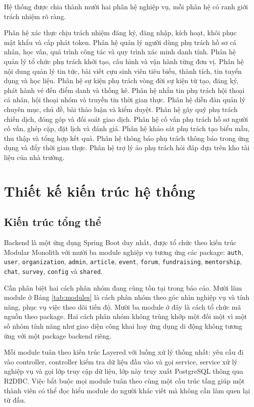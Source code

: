 \documentclass[12pt,a4paper,oneside]{report}
\begin{document}
Hệ thống được chia thành mười hai phân hệ nghiệp vụ, mỗi phân hệ có ranh giới trách nhiệm rõ ràng.

Phân hệ xác thực chịu trách nhiệm đăng ký, đăng nhập, kích hoạt, khôi phục mật khẩu và cấp phát token. Phân hệ quản lý người dùng phụ trách hồ sơ cá nhân, học vấn, quá trình công tác và quy trình xác minh danh tính. Phân hệ quản lý tổ chức phụ trách khởi tạo, cấu hình và vận hành từng đơn vị. Phân hệ nội dung quản lý tin tức, bài viết cựu sinh viên tiêu biểu, thành tích, tin tuyển dụng và học liệu. Phân hệ sự kiện phụ trách vòng đời sự kiện từ tạo, đăng ký, phát hành vé đến điểm danh và thống kê. Phân hệ nhắn tin phụ trách hội thoại cá nhân, hội thoại nhóm và truyền tin thời gian thực. Phân hệ diễn đàn quản lý chuyên mục, chủ đề, bài thảo luận và kiểm duyệt. Phân hệ gây quỹ phụ trách chiến dịch, đóng góp và đối soát giao dịch. Phân hệ cố vấn phụ trách hồ sơ người cố vấn, ghép cặp, đặt lịch và đánh giá. Phân hệ khảo sát phụ trách tạo biểu mẫu, thu thập và tổng hợp kết quả. Phân hệ thông báo phụ trách thông báo trong ứng dụng và đẩy thời gian thực. Phân hệ trợ lý ảo phụ trách hỏi đáp dựa trên kho tài liệu của nhà trường.

\section{Thiết kế kiến trúc hệ thống}

\subsection{Kiến trúc tổng thể}

Backend là một ứng dụng Spring Boot duy nhất, được tổ chức theo kiến trúc Modular Monolith với mười ba module nghiệp vụ tương ứng các package: \texttt{auth}, \texttt{user}, \texttt{organization}, \texttt{admin}, \texttt{article}, \texttt{event}, \texttt{forum}, \texttt{fundraising}, \texttt{mentorship}, \texttt{chat}, \texttt{survey}, \texttt{config} và \texttt{shared}.

Cần phân biệt hai cách phân nhóm đang cùng tồn tại trong báo cáo. Mười lăm module ở Bảng \ref{tab:modules} là cách phân nhóm theo góc nhìn nghiệp vụ và tính năng, phục vụ việc theo dõi tiến độ. Mười ba module ở đây là cách tổ chức mã nguồn theo package. Hai cách phân nhóm không trùng khớp một đối một vì một số nhóm tính năng như giao diện công khai hay ứng dụng di động không tương ứng với một package backend riêng.

Mỗi module tuân theo kiến trúc Layered với luồng xử lý thống nhất: yêu cầu đi vào controller, controller kiểm tra dữ liệu đầu vào và gọi service, service xử lý nghiệp vụ và gọi lớp truy cập dữ liệu, lớp này truy xuất PostgreSQL thông qua R2DBC. Việc bắt buộc mọi module tuân theo cùng một cấu trúc tầng giúp một thành viên có thể đọc hiểu module do người khác viết mà không cần làm quen lại từ đầu.
\end{document}
